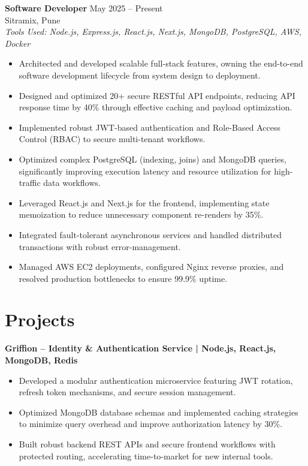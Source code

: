\documentclass[a4paper,10pt]{article}
\begin{document}
\textbf{Software Developer} \hfill May 2025 -- Present\\
Sitramix, Pune\\
\textit{Tools Used: Node.js, Express.js, React.js, Next.js, MongoDB, PostgreSQL, AWS, Docker}


\begin{itemize}[leftmargin=*]
    \item Architected and developed scalable full-stack features, owning the end-to-end software development lifecycle from system design to deployment.
    \item Designed and optimized 20+ secure RESTful API endpoints, reducing API response time by 40\% through effective caching and payload optimization.
    \item Implemented robust JWT-based authentication and Role-Based Access Control (RBAC) to secure multi-tenant workflows.
    \item Optimized complex PostgreSQL (indexing, joins) and MongoDB queries, significantly improving execution latency and resource utilization for high-traffic data workflows.
    \item Leveraged React.js and Next.js for the frontend, implementing state memoization to reduce unnecessary component re-renders by 35\%.
    \item Integrated fault-tolerant asynchronous services and handled distributed transactions with robust error-management.
    \item Managed AWS EC2 deployments, configured Nginx reverse proxies, and resolved production bottlenecks to ensure 99.9\% uptime.
\end{itemize}


\section*{Projects}

\textbf{Griffion -- Identity \& Authentication Service | Node.js, React.js, MongoDB, Redis}

\begin{itemize}[leftmargin=*]
    \item Developed a modular authentication microservice featuring JWT rotation, refresh token mechanisms, and secure session management.
    \item Optimized MongoDB database schemas and implemented caching strategies to minimize query overhead and improve authorization latency by 30\%.
    \item Built robust backend REST APIs and secure frontend workflows with protected routing, accelerating time-to-market for new internal tools.
\end{itemize}
\end{document}
